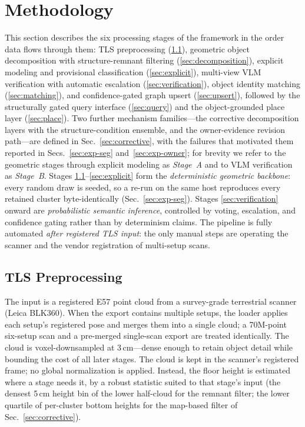 \section{Methodology}
\label{sec:methodology}

This section describes the six processing stages of the framework in the
order data flows through them: TLS preprocessing (\ref{sec:preprocess}),
geometric object decomposition with structure-remnant filtering
(\ref{sec:decomposition}), explicit modeling and provisional classification
(\ref{sec:explicit}), multi-view VLM verification with automatic escalation
(\ref{sec:verification}), object identity matching (\ref{sec:matching}), and
confidence-gated graph upsert (\ref{sec:upsert}), followed by the structurally
gated query interface (\ref{sec:query}) and the object-grounded place layer
(\ref{sec:place}). Two further mechanism families---the corrective
decomposition layers with the structure-condition ensemble, and the
owner-evidence revision path---are defined in Sec.~\ref{sec:corrective},
with the failures that motivated them reported in
Secs.~\ref{sec:exp-seg} and~\ref{sec:exp-owner}; for brevity we refer
to the geometric stages through explicit modeling as \emph{Stage~A} and
to VLM verification as \emph{Stage~B}. Stages \ref{sec:preprocess}--\ref{sec:explicit} form the
\emph{deterministic geometric backbone}: every random draw is seeded, so a
re-run on the same host reproduces every retained cluster byte-identically
(Sec.~\ref{sec:exp-seg}). Stages \ref{sec:verification} onward are \emph{probabilistic
semantic inference}, controlled by voting, escalation, and confidence gating
rather than by determinism claims. The pipeline is fully automated
\emph{after registered TLS input}: the only manual steps are operating the
scanner and the vendor registration of multi-setup scans.

\subsection{TLS Preprocessing}
\label{sec:preprocess}

The input is a registered E57 point cloud from a survey-grade terrestrial
scanner (Leica BLK360). When the export contains multiple setups, the loader
applies each setup's registered pose and merges them into a single cloud; a
70M-point six-setup scan and a pre-merged single-scan export are treated
identically. The cloud is voxel-downsampled at 3\,cm---dense enough to retain
object detail while bounding the cost of all later stages. The cloud is kept
in the scanner's registered frame; no global normalization is applied.
Instead, the floor height is estimated where a stage needs it, by a robust
statistic suited to that stage's input (the densest 5\,cm height bin of the
lower half-cloud for the remnant filter; the lower quartile of per-cluster
bottom heights for the map-based filter of
Sec.~\ref{sec:corrective}).

